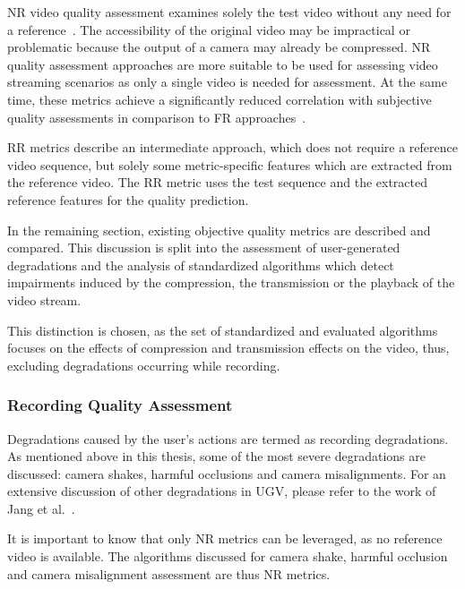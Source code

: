 \ac{NR} video quality assessment examines solely the test video without any need for a reference~\cite{Winkler2008}. 
The accessibility of the original video may be impractical or problematic because the output of a camera may already be compressed. 
\ac{NR} quality assessment approaches are more suitable to be used for assessing video streaming scenarios as only a single video is needed for assessment.
At the same time, these metrics achieve a significantly reduced correlation with subjective quality assessments in comparison to \ac{FR} approaches~\cite{Winkler2009}.

\ac{RR} metrics describe an intermediate approach, which does not require a reference video sequence, but solely some metric-specific features which are extracted from the reference video.
The \ac{RR} metric uses the test sequence and the extracted reference features for the quality prediction.

In the remaining section, existing objective quality metrics are described and compared.
This discussion is split into the assessment of user-generated degradations and the analysis of standardized algorithms which detect impairments induced by the compression, the transmission or the playback of the video stream.

This distinction is chosen, as the set of standardized and evaluated algorithms focuses on the effects of compression and transmission effects on the video, thus, excluding degradations occurring while recording.
\subsubsection{Recording Quality Assessment}
\label{sec:210_VideoQuality}
Degradations caused by the user's actions are termed as recording degradations.
As mentioned above in this thesis, some of the most severe degradations are discussed: camera shakes, harmful occlusions and camera misalignments.
For an extensive discussion of other degradations in \ac{UGV}, please refer to the work of Jang et al.~\cite{Jang2016}.

It is important to know that only \ac{NR} metrics can be leveraged, as no reference video is available.
The algorithms discussed for camera shake, harmful occlusion and camera misalignment assessment are thus \ac{NR} metrics.

